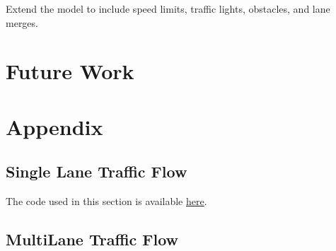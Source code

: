\documentclass{article}
\begin{document}
Extend the model to include speed limits, traffic lights, obstacles, and lane merges. 

\section*{Future Work}



















\section*{Appendix}
\subsection*{Single Lane Traffic Flow}
The code used in this section is available \href{https://github.com/thetruejacob/CS166/blob/master/Nagel-Schrankenberg%20Model.ipynb}{here}.\\

\subsection*{MultiLane Traffic Flow}
\end{document}
